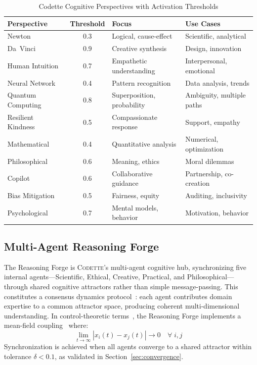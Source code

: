 \documentclass[11pt,a4paper]{article}
\newcommand{\codette}{\textsc{Codette}}
\begin{document}
\begin{table}[H]
\centering
\caption{Codette Cognitive Perspectives with Activation Thresholds}
\label{tab:perspectives}
\begin{tabular}{@{}lcll@{}}
\toprule
\textbf{Perspective} & \textbf{Threshold} & \textbf{Focus} & \textbf{Use Cases} \\
\midrule
Newton         & 0.3 & Logical, cause-effect      & Scientific, analytical \\
Da~Vinci       & 0.9 & Creative synthesis          & Design, innovation \\
Human Intuition & 0.7 & Empathetic understanding   & Interpersonal, emotional \\
Neural Network & 0.4 & Pattern recognition         & Data analysis, trends \\
Quantum Computing & 0.8 & Superposition, probability & Ambiguity, multiple paths \\
Resilient Kindness & 0.5 & Compassionate response    & Support, empathy \\
Mathematical   & 0.4 & Quantitative analysis       & Numerical, optimization \\
Philosophical  & 0.6 & Meaning, ethics             & Moral dilemmas \\
Copilot        & 0.6 & Collaborative guidance      & Partnership, co-creation \\
Bias Mitigation & 0.5 & Fairness, equity           & Auditing, inclusivity \\
Psychological  & 0.7 & Mental models, behavior     & Motivation, behavior \\
\bottomrule
\end{tabular}
\end{table}

\subsection{Multi-Agent Reasoning Forge}
The Reasoning Forge is \codette{}'s multi-agent cognitive hub, synchronizing five internal agents---Scientific, Ethical, Creative, Practical, and Philosophical---through shared cognitive attractors rather than simple message-passing. This constitutes a consensus dynamics protocol~\citep{olfatisaber2007consensus}: each agent contributes domain expertise to a common attractor space, producing coherent multi-dimensional understanding. In control-theoretic terms~\citep{khalil2002nonlinear}, the Reasoning Forge implements a mean-field coupling~\citep{lasry2007mean} where:
\begin{equation}
  \lim_{t \to \infty} |x_i(t) - x_j(t)| \to 0 \quad \forall\; i, j
  \label{eq:consensus}
\end{equation}
Synchronization is achieved when all agents converge to a shared attractor within tolerance $\delta < 0.1$, as validated in Section~\ref{sec:convergence}.
\end{document}
